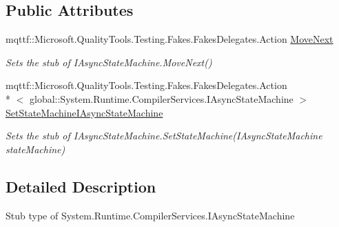 \subsection*{Public Attributes}
\begin{DoxyCompactItemize}
\item 
mqttf\-::\-Microsoft.\-Quality\-Tools.\-Testing.\-Fakes.\-Fakes\-Delegates.\-Action \hyperlink{class_system_1_1_runtime_1_1_compiler_services_1_1_fakes_1_1_stub_i_async_state_machine_a380f5eda78aecaf99ccf71cf53a1ce56}{Move\-Next}
\begin{DoxyCompactList}\small\item\em Sets the stub of I\-Async\-State\-Machine.\-Move\-Next()\end{DoxyCompactList}\item 
mqttf\-::\-Microsoft.\-Quality\-Tools.\-Testing.\-Fakes.\-Fakes\-Delegates.\-Action\\*
$<$ global\-::\-System.\-Runtime.\-Compiler\-Services.\-I\-Async\-State\-Machine $>$ \hyperlink{class_system_1_1_runtime_1_1_compiler_services_1_1_fakes_1_1_stub_i_async_state_machine_a9a5c04e1df68ac7c330565198ff205f6}{Set\-State\-Machine\-I\-Async\-State\-Machine}
\begin{DoxyCompactList}\small\item\em Sets the stub of I\-Async\-State\-Machine.\-Set\-State\-Machine(\-I\-Async\-State\-Machine state\-Machine)\end{DoxyCompactList}\end{DoxyCompactItemize}


\subsection{Detailed Description}
Stub type of System.\-Runtime.\-Compiler\-Services.\-I\-Async\-State\-Machine



